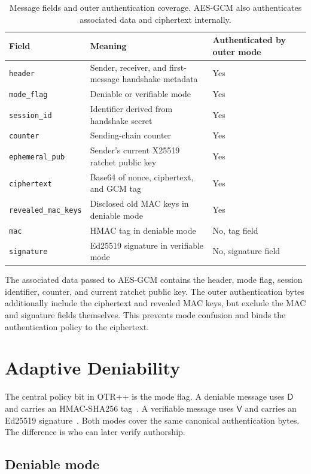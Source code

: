 \documentclass[11pt]{article}
\newcommand{\prot}{OTR++}
\newcommand{\modeD}{\mathsf{D}}
\newcommand{\modeV}{\mathsf{V}}
\begin{document}
\begin{table}[t]
\centering
\begin{tabular}{@{}lll@{}}
\toprule
Field & Meaning & Authenticated by outer mode \\
\midrule
\texttt{header} & Sender, receiver, and first-message handshake metadata & Yes \\
\texttt{mode\_flag} & Deniable or verifiable mode & Yes \\
\texttt{session\_id} & Identifier derived from handshake secret & Yes \\
\texttt{counter} & Sending-chain counter & Yes \\
\texttt{ephemeral\_pub} & Sender's current X25519 ratchet public key & Yes \\
\texttt{ciphertext} & Base64 of nonce, ciphertext, and GCM tag & Yes \\
\texttt{revealed\_mac\_keys} & Disclosed old MAC keys in deniable mode & Yes \\
\texttt{mac} & HMAC tag in deniable mode & No, tag field \\
\texttt{signature} & Ed25519 signature in verifiable mode & No, signature field \\
\bottomrule
\end{tabular}
\caption{Message fields and outer authentication coverage. AES-GCM also authenticates associated data and ciphertext internally.}
\label{tab:message-format}
\end{table}

The associated data passed to AES-GCM contains the header, mode flag, session identifier, counter, and current ratchet public key. The outer authentication bytes additionally include the ciphertext and revealed MAC keys, but exclude the MAC and signature fields themselves. This prevents mode confusion and binds the authentication policy to the ciphertext.

\section{Adaptive Deniability}
\label{sec:deniability}

The central policy bit in \prot{} is the mode flag. A deniable message uses $\modeD$ and carries an HMAC-SHA256 tag~\cite{rfc2104}. A verifiable message uses $\modeV$ and carries an Ed25519 signature~\cite{rfc8032}. Both modes cover the same canonical authentication bytes. The difference is who can later verify authorship.

\subsection{Deniable mode}
\end{document}
